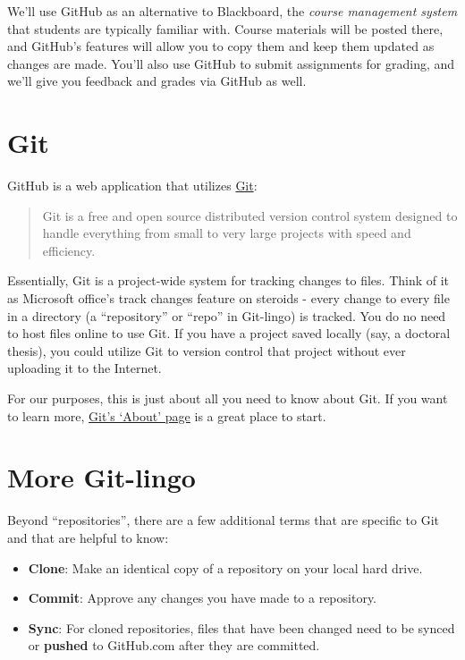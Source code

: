 \documentclass[]{book}
\providecommand{\tightlist}{%
  \setlength{\itemsep}{0pt}\setlength{\parskip}{0pt}}
\begin{document}
We'll use GitHub as an alternative to Blackboard, the \emph{course
management system} that students are typically familiar with. Course
materials will be posted there, and GitHub's features will allow you to
copy them and keep them updated as changes are made. You'll also use
GitHub to submit assignments for grading, and we'll give you feedback
and grades via GitHub as well.

\section{Git}\label{git}

GitHub is a web application that utilizes
\href{https://git-scm.com}{Git}:

\begin{quote}
Git is a free and open source distributed version control system
designed to handle everything from small to very large projects with
speed and efficiency.
\end{quote}

Essentially, Git is a project-wide system for tracking changes to files.
Think of it as Microsoft office's track changes feature on steroids -
every change to every file in a directory (a ``repository'' or ``repo''
in Git-lingo) is tracked. You do no need to host files online to use
Git. If you have a project saved locally (say, a doctoral thesis), you
could utilize Git to version control that project without ever uploading
it to the Internet.

For our purposes, this is just about all you need to know about Git. If
you want to learn more, \href{https://git-scm.com/about}{Git's `About'
page} is a great place to start.

\section{More Git-lingo}\label{more-git-lingo}

Beyond ``repositories'', there are a few additional terms that are
specific to Git and that are helpful to know:

\begin{itemize}
\tightlist
\item
  \textbf{Clone}: Make an identical copy of a repository on your local
  hard drive.
\item
  \textbf{Commit}: Approve any changes you have made to a repository.
\item
  \textbf{Sync}: For cloned repositories, files that have been changed
  need to be synced or \textbf{pushed} to GitHub.com after they are
  committed.
\end{itemize}
\end{document}
